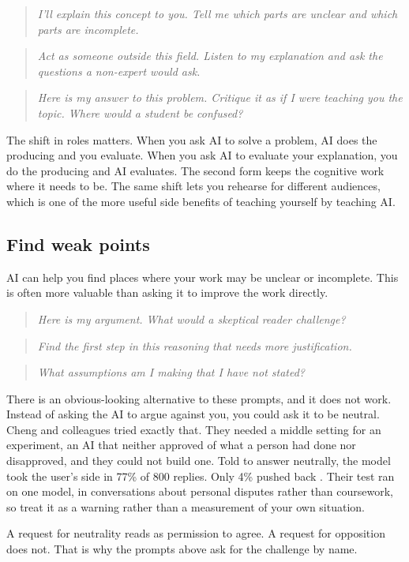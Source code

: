 \documentclass{SIAMbook2023}
\newcommand{\studentprompt}[1]{\begin{quote}\small\itshape #1\end{quote}}
\begin{document}
\studentprompt{I'll explain this concept to you. Tell me which parts are unclear and which parts are incomplete.}

\studentprompt{Act as someone outside this field. Listen to my explanation and ask the questions a non-expert would ask.}

\studentprompt{Here is my answer to this problem. Critique it as if I were teaching you the topic. Where would a student be confused?}

The shift in roles matters. When you ask AI to solve a problem, AI does the producing and you evaluate. When you ask AI to evaluate your explanation, you do the producing and AI evaluates. The second form keeps the cognitive work where it needs to be. The same shift lets you rehearse for different audiences, which is one of the more useful side benefits of teaching yourself by teaching AI.

\subsection{Find weak points}
\label{subsec:weak-points}

AI can help you find places where your work may be unclear or incomplete. This is often more valuable than asking it to improve the work directly.

\studentprompt{Here is my argument. What would a skeptical reader challenge?}

\studentprompt{Find the first step in this reasoning that needs more justification.}

\studentprompt{What assumptions am I making that I have not stated?}

There is an obvious-looking alternative to these prompts, and it does not work. Instead of asking the AI to argue against you, you could ask it to be neutral. Cheng and colleagues tried exactly that. They needed a middle setting for an experiment, an AI that neither approved of what a person had done nor disapproved, and they could not build one. Told to answer neutrally, the model took the user's side in 77\% of 800 replies. Only 4\% pushed back \citep{cheng2026sycophantic}. Their test ran on one model, in conversations about personal disputes rather than coursework, so treat it as a warning rather than a measurement of your own situation.

A request for neutrality reads as permission to agree. A request for opposition does not. That is why the prompts above ask for the challenge by name.
\end{document}
